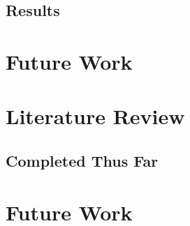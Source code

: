 \documentclass{article}
\begin{document}


\subsection{Results}



\section{Future Work}



\section{Literature Review}

\subsection{Completed Thus Far}



\nocite{*}



\section{Future Work}





% 
\end{document}
